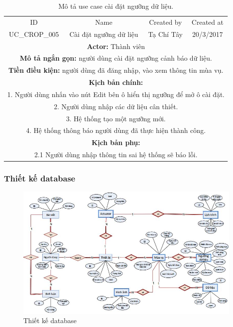 \documentclass[a4paper,12pt,oneside]{article}
\begin{document}
\newpage
\begin{table}[!htp]
\centering
\begin{tabularx}{\linewidth}{ |c||c|c|c| }
\hline
ID & Name & Created by & Created at\\
UC\_CROP\_005 & Cài đặt ngưỡng dữ liệu & Tạ Chí Tây & 20/3/2017\\
\hline
\multicolumn{4}{|X|}{\textbf{Actor:} Thành viên }\\
\hline
\multicolumn{4}{|X|}{\textbf{Mô tả ngắn gọn:} người dùng cài đặt ngưỡng cảnh báo dữ liệu. }\\
\hline
\multicolumn{4}{|X|}{\textbf{Tiền điều kiện:} người dùng đã đăng nhập, vào xem thông tin mùa vụ.}\\
\hline
\multicolumn{4}{|X|}{\textbf{Kịch bản chính:}}\\
\multicolumn{4}{|X|}{ 1.	Người dùng nhấn vào nút Edit bên ô hiển thị ngưỡng để mở ô cài đặt.}\\
\multicolumn{4}{|X|}{
2.	Người dùng nhập các dữ liệu cân thiết.}\\
\multicolumn{4}{|X|}{
3.	Hệ thống tạo một ngưỡng mới.}\\

\multicolumn{4}{|X|}{4. Hệ thống thông báo người dùng đã thực hiện thành công.}\\
\hline
\multicolumn{4}{|X|}{\textbf{Kịch bản phụ:}}\\
\multicolumn{4}{|X|}{2.1    Người dùng nhập thông tin sai hệ thống sẽ báo lỗi.}\\
\hline

\end{tabularx}
\caption{Mô tả use case cài đặt ngưỡng dữ liệu.}
\end{table}

\subsubsection{Thiết kế database}

\begin{landscape}
\begin{figure}[b]
\includegraphics[scale=1.1]{hinh/database.jpg}
\caption{ Thiết kế database}
\label{xyz}
\end{figure}
\end{landscape}
\end{document}
